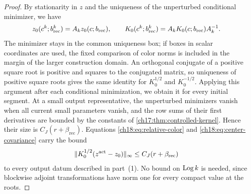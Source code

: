 \begin{proof}
By stationarity in $z$ and the uniqueness of the unperturbed conditional minimizer, we have
\begin{equation}\label{ch18:eq:center-covariance}
 z_0(c^k;b_{\mathrm{rec}}^k)=A_kz_0(c;b_{\mathrm{rec}}),\qquad
 K_0(c^k;b_{\mathrm{rec}}^k)=A_kK_0(c;b_{\mathrm{rec}})A_k^{-1}.
\end{equation}
The minimizer stays in the common uniqueness box; if boxes in scalar coordinates are used, the fixed comparison of color norms is included in the margin of the larger construction domain. An orthogonal conjugate of a positive square root is positive and squares to the conjugated matrix, so uniqueness of positive square roots gives the same identity for $K_0^{1/2}$ and $K_0^{-1/2}$. Applying this argument after each conditional minimization, we obtain it for every initial segment. At a small output representative, the unperturbed minimizers vanish when all current small parameters vanish, and the row sums of their first derivatives are bounded by the constants of \cref{ch17:thm:controlled-kernel}. Hence their size is $C_J(r+\beta_{\mathrm{rec}})$. Equations \eqref{ch18:eq:relative-color} and \eqref{ch18:eq:center-covariance} carry the bound
\begin{equation}\label{ch18:eq:unperturbed-distance}
 \lVert K_0^{1/2}(z^{\mathrm{act}}-z_0)\rVert_\infty
                  \le C_J(r+\beta_{\mathrm{rec}})
\end{equation}
to every output datum described in part~(1). No bound on $\operatorname{Log} k$ is needed, since blockwise adjoint transformations have norm one for every compact value at the roots.


\end{proof}
